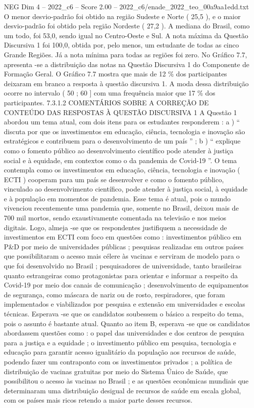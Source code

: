 \begin{textsample}{NEG Dim 4 – 2022\_c6 – Score 2.00 – 2022\_c6/enade\_2022\_teo\_00a9aa1edd.txt}
O menor desvio-padrão foi obtido na região Sudeste e Norte ( 25,5 ), e o maior desvio-padrão foi obtido pela região Nordeste ( 27,2 ).
A mediana do Brasil, como um todo, foi 53,0, sendo igual no Centro-Oeste e Sul.
A nota máxima da Questão Discursiva 1 foi 100,0, obtida por, pelo menos, um estudante de todas as cinco Grande Regiões.
Já a nota mínima para todas as regiões foi zero.
No Gráfico 7.7, apresenta -se a distribuição das notas na Questão Discursiva 1 do Componente de Formação Geral.
O Gráfico 7.7 mostra que mais de 12 \% dos participantes deixaram em branco a resposta à questão discursiva 1.
A moda dessa distribuição ocorre no intervalo ( 50 ; 60 ] com uma frequência maior que 17 \% dos participantes. 7.3.1.2 COMENTÁRIOS SOBRE A CORREÇÃO DE CONTEÚDO DAS RESPOSTAS À QUESTÃO DISCURSIVA 1 A Questão 1 abordou um tema atual, com dois itens para os estudantes responderem : a ) “ discuta por que os investimentos em educação, ciência, tecnologia e inovação são estratégicos e contribuem para o desenvolvimento de um país ” ; b ) “ explique como o fomento público ao desenvolvimento científico pode atender à justiça social e à equidade, em contextos como o da pandemia de Covid-19 ”.
O tema contempla como os investimentos em educação, ciência, tecnologia e inovação ( ECTI ) cooperam para um país se desenvolver e como o fomento público, vinculado ao desenvolvimento científico, pode atender à justiça social, à equidade e à população em momentos de pandemia.
Esse tema é atual, pois o mundo vivenciou recentemente uma pandemia que, somente no Brasil, deixou mais de 700 mil mortos, sendo exaustivamente comentada na televisão e nos meios digitais.
Logo, almeja -se que os respondentes justifiquem a necessidade de investimentos em ECTI com foco em questões como : investimentos público em P\&D por meio de universidades públicas ; pesquisas realizadas em outros países que possibilitaram o acesso mais célere às vacinas e serviram de modelo para o que foi desenvolvido no Brasil ; pesquisadores de universidade, tanto brasileiras quanto estrangeiras como protagonistas para orientar e informar a respeito da Covid-19 por meio dos canais de comunicação ; desenvolvimento de equipamentos de segurança, como máscara de nariz ou de rosto, respiradores, que foram implementados e viabilizados por pesquisa e extensão em universidades e escolas técnicas.
Esperava -se que os candidatos soubessem o básico a respeito do tema, pois o assunto é bastante atual.
Quanto ao item B, esperava -se que os candidatos abordassem questões como : o papel das universidades e dos centros de pesquisa para a justiça e a equidade ; o investimento público em pesquisa, tecnologia e educação para garantir acesso igualitário da população aos recursos de saúde, podendo fazer um contraponto com os investimentos privados ; a política de distribuição de vacinas gratuitas por meio do Sistema Único de Saúde, que possibilitou o acesso às vacinas no Brasil ; e as questões econômicas mundiais que determinaram uma distribuição desigual de recursos de saúde em escala global, com os países mais ricos retendo a maior parte desses recursos.

\end{textsample}
